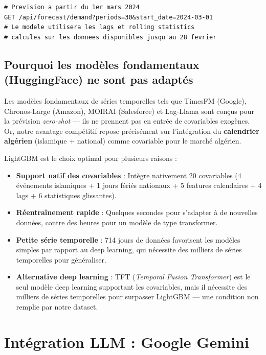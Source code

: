 \documentclass[12pt,a4paper]{report}
\begin{document}
\lstset{language=Python}
\begin{lstlisting}[caption={Exemple d'appel API avec date de d\'{e}part personnalis\'{e}e}]
# Prevision a partir du 1er mars 2024
GET /api/forecast/demand?periods=30&start_date=2024-03-01
# Le modele utilisera les lags et rolling statistics
# calcules sur les donnees disponibles jusqu'au 28 fevrier
\end{lstlisting}

\subsection{Pourquoi les mod\`{e}les fondamentaux (HuggingFace) ne sont pas adapt\'{e}s}

Les mod\`{e}les fondamentaux de s\'{e}ries temporelles tels que TimesFM (Google), Chronos-Large (Amazon), MOIRAI (Salesforce) et Lag-Llama sont con\c{c}us pour la pr\'{e}vision \textit{zero-shot} --- ils ne prennent pas en entr\'{e}e de covariables exog\`{e}nes. Or, notre avantage comp\'{e}titif repose pr\'{e}cis\'{e}ment sur l'int\'{e}gration du \textbf{calendrier alg\'{e}rien} (islamique + national) comme covariable pour le march\'{e} alg\'{e}rien.

LightGBM est le choix optimal pour plusieurs raisons :

\begin{itemize}
  \item \textbf{Support natif des covariables} : Int\`{e}gre nativement 20 covariables (4 \'{e}v\'{e}nements islamiques + 1 jours f\'{e}ri\'{e}s nationaux + 5 features calendaires + 4 lags + 6 statistiques glissantes).
  \item \textbf{R\'{e}entra\^{i}nement rapide} : Quelques secondes pour s'adapter \`{a} de nouvelles donn\'{e}es, contre des heures pour un mod\`{e}le de type transformer.
  \item \textbf{Petite s\'{e}rie temporelle} : 714 jours de donn\'{e}es favorisent les mod\`{e}les simples par rapport au deep learning, qui n\'{e}cessite des milliers de s\'{e}ries temporelles pour g\'{e}n\'{e}raliser.
  \item \textbf{Alternative deep learning} : TFT (\textit{Temporal Fusion Transformer}) est le seul mod\`{e}le deep learning supportant les covariables, mais il n\'{e}cessite des milliers de s\'{e}ries temporelles pour surpasser LightGBM --- une condition non remplie par notre dataset.
\end{itemize}


\section{Int\'{e}gration LLM : Google Gemini}
\end{document}
